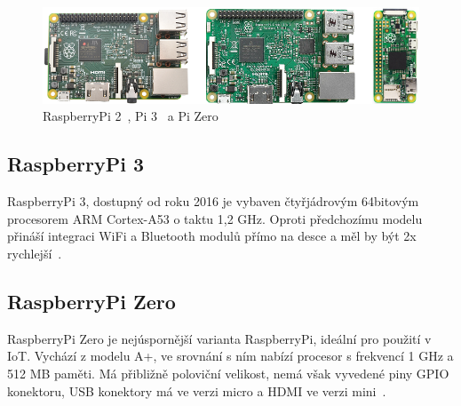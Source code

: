 	\begin{figure}[!h]
  \begin{center}
   \includegraphics[scale=0.6]{obrazky/embed_raspi_all}
  \end{center}
  \caption{RaspberryPi 2~\cite{RaspiTwo}, Pi 3~\cite{RaspiThree} a Pi Zero~\cite{RaspiZero}}
\end{figure}

	\newpage

\subsection{RaspberryPi 3}
		RaspberryPi 3, dostupný od roku 2016 je vybaven čtyřjádrovým 64bitovým procesorem ARM Cortex-A53 o taktu 1,2 GHz. Oproti předchozímu modelu přináší integraci WiFi a Bluetooth modulů přímo na desce a měl by být 2x rychlejší~\cite{RaspiThree}.
		

	
\subsection{RaspberryPi Zero}
		RaspberryPi Zero je nejúspornější varianta RaspberryPi, ideální pro použití v IoT. Vychází z modelu A+, ve srovnání s ním nabízí procesor s frekvencí 1 GHz a 512 MB paměti. Má přibližně poloviční velikost, nemá však vyvedené piny GPIO konektoru, USB konektory má ve verzi micro a HDMI ve verzi mini~\cite{RaspiZero}.



